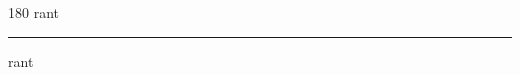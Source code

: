 
\begin{frame}
\begin{center}
\begin{turn}{180}
{\fontsize{2.5cm}{1em}\selectfont rant}
\end{turn}
\vspace{1em}\par  
\hrule
\vspace{1em}\par  
{\fontsize{2.5cm}{1em}\selectfont rant}
\end{center}
\end{frame}
